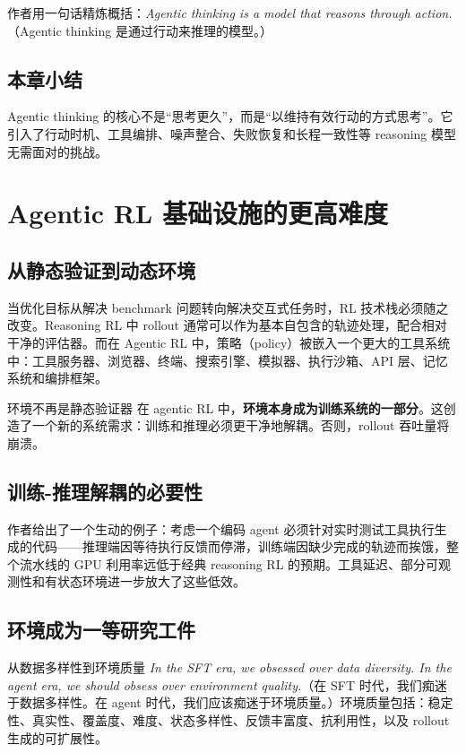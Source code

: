 \documentclass[a4paper]{article}
\begin{document}
作者用一句话精炼概括：\textit{Agentic thinking is a model that reasons through action.}（Agentic thinking 是通过行动来推理的模型。）

\subsection{本章小结}

Agentic thinking 的核心不是``思考更久''，而是``以维持有效行动的方式思考''。它引入了行动时机、工具编排、噪声整合、失败恢复和长程一致性等 reasoning 模型无需面对的挑战。


\section{Agentic RL 基础设施的更高难度}

\subsection{从静态验证到动态环境}

当优化目标从解决 benchmark 问题转向解决交互式任务时，RL 技术栈必须随之改变。Reasoning RL 中 rollout 通常可以作为基本自包含的轨迹处理，配合相对干净的评估器。而在 Agentic RL 中，策略（policy）被嵌入一个更大的工具系统中：工具服务器、浏览器、终端、搜索引擎、模拟器、执行沙箱、API 层、记忆系统和编排框架。

\begin{warningbox}{环境不再是静态验证器}
在 agentic RL 中，\textbf{环境本身成为训练系统的一部分}。这创造了一个新的系统需求：训练和推理必须更干净地解耦。否则，rollout 吞吐量将崩溃。
\end{warningbox}

\subsection{训练-推理解耦的必要性}

作者给出了一个生动的例子：考虑一个编码 agent 必须针对实时测试工具执行生成的代码——推理端因等待执行反馈而停滞，训练端因缺少完成的轨迹而挨饿，整个流水线的 GPU 利用率远低于经典 reasoning RL 的预期。工具延迟、部分可观测性和有状态环境进一步放大了这些低效。

\subsection{环境成为一等研究工件}

\begin{importantbox}{从数据多样性到环境质量}
\textit{In the SFT era, we obsessed over data diversity. In the agent era, we should obsess over environment quality.}（在 SFT 时代，我们痴迷于数据多样性。在 agent 时代，我们应该痴迷于环境质量。）环境质量包括：稳定性、真实性、覆盖度、难度、状态多样性、反馈丰富度、抗利用性，以及 rollout 生成的可扩展性。
\end{importantbox}
\end{document}
